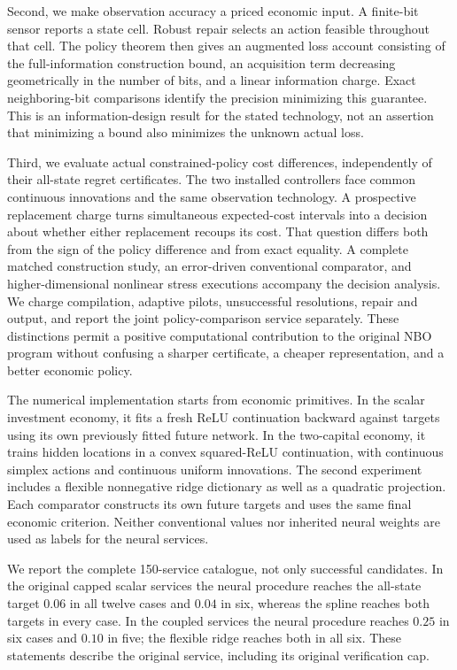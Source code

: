 \documentclass[ecta,nameyear,draft]{econsocart}
\begin{document}
Second, we make observation accuracy a priced economic input. A finite-bit sensor reports a state cell. Robust repair selects an action feasible throughout that cell. The policy theorem then gives an augmented loss account consisting of the full-information construction bound, an acquisition term decreasing geometrically in the number of bits, and a linear information charge. Exact neighboring-bit comparisons identify the precision minimizing this guarantee. This is an information-design result for the stated technology, not an assertion that minimizing a bound also minimizes the unknown actual loss.

Third, we evaluate actual constrained-policy cost differences, independently of their all-state regret certificates. The two installed controllers face common continuous innovations and the same observation technology. A prospective replacement charge turns simultaneous expected-cost intervals into a decision about whether either replacement recoups its cost. That question differs both from the sign of the policy difference and from exact equality. A complete matched construction study, an error-driven conventional comparator, and higher-dimensional nonlinear stress executions accompany the decision analysis. We charge compilation, adaptive pilots, unsuccessful resolutions, repair and output, and report the joint policy-comparison service separately. These distinctions permit a positive computational contribution to the original NBO program without confusing a sharper certificate, a cheaper representation, and a better economic policy.

The numerical implementation starts from economic primitives. In the scalar investment economy, it fits a fresh ReLU continuation backward against targets using its own previously fitted future network. In the two-capital economy, it trains hidden locations in a convex squared-ReLU continuation, with continuous simplex actions and continuous uniform innovations. The second experiment includes a flexible nonnegative ridge dictionary as well as a quadratic projection. Each comparator constructs its own future targets and uses the same final economic criterion. Neither conventional values nor inherited neural weights are used as labels for the neural services.

We report the complete 150-service catalogue, not only successful candidates. In the original capped scalar services the neural procedure reaches the all-state target $0.06$ in all twelve cases and $0.04$ in six, whereas the spline reaches both targets in every case. In the coupled services the neural procedure reaches $0.25$ in six cases and $0.10$ in five; the flexible ridge reaches both in all six. These statements describe the original service, including its original verification cap.
\end{document}
